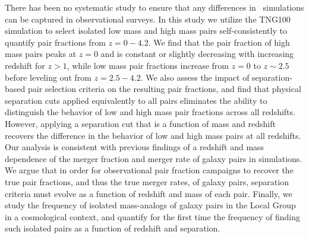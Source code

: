   
  There has been no systematic study to ensure that any differences in \lcdm\ simulations can be captured in observational surveys. 
  In this study we utilize the TNG100 simulation to select isolated low mass and high mass pairs self-consistently to quantify pair fractions from $z=0-4.2$.
  We find that the pair fraction of high mass pairs peaks at $z=0$ and is constant or slightly decreasing with increasing redshift for $z>1$, while low mass pair fractions increase from $z=0$ to $z\sim2.5$ before leveling out from $z=2.5-4.2$.
  We also assess the impact of separation-based pair selection criteria on the resulting pair fractions, and find that physical separation cuts applied equivalently to all pairs eliminates the ability to distinguish the behavior of low and high mass pair fractions across all redshifts. 
  However, applying a separation cut that is a function of mass and redshift recovers the difference in the behavior of low and high mass pairs at all redshifts. 
  Our analysis is consistent with previous findings of a redshift and mass dependence of the merger fraction and merger rate of galaxy pairs in simulations. 
  We argue that in order for observational pair fraction campaigns to recover the true pair fractions, and thus the true merger rates, of galaxy pairs, separation criteria must evolve as a function of redshift and mass of each pair.
  Finally, we study the frequency of isolated mass-analogs of galaxy pairs in the Local Group in a cosmological context, and quantify for the first time the frequency of finding such isolated pairs as a function of redshift and separation.